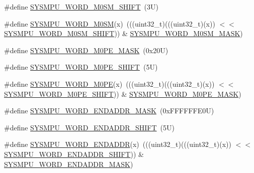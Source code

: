 \begin{DoxyCompactItemize}
\#define \mbox{\hyperlink{group___s_y_s_m_p_u___register___masks_gadaf9df921f73cb74a891b96031c798fb}{S\+Y\+S\+M\+P\+U\+\_\+\+W\+O\+R\+D\+\_\+\+M0\+S\+M\+\_\+\+S\+H\+I\+FT}}~(3\+U)
\item 
\#define \mbox{\hyperlink{group___s_y_s_m_p_u___register___masks_gae2a5cec6f6707a4132761c05f8d69071}{S\+Y\+S\+M\+P\+U\+\_\+\+W\+O\+R\+D\+\_\+\+M0\+SM}}(x)~(((uint32\+\_\+t)(((uint32\+\_\+t)(x)) $<$$<$ \mbox{\hyperlink{group___s_y_s_m_p_u___register___masks_gadaf9df921f73cb74a891b96031c798fb}{S\+Y\+S\+M\+P\+U\+\_\+\+W\+O\+R\+D\+\_\+\+M0\+S\+M\+\_\+\+S\+H\+I\+FT}})) \& \mbox{\hyperlink{group___s_y_s_m_p_u___register___masks_gaa2b6a90954e96cd27843e4977cadecb8}{S\+Y\+S\+M\+P\+U\+\_\+\+W\+O\+R\+D\+\_\+\+M0\+S\+M\+\_\+\+M\+A\+SK}})
\item 
\#define \mbox{\hyperlink{group___s_y_s_m_p_u___register___masks_gaff5e58417e71b136bcef7ac03177ca2e}{S\+Y\+S\+M\+P\+U\+\_\+\+W\+O\+R\+D\+\_\+\+M0\+P\+E\+\_\+\+M\+A\+SK}}~(0x20\+U)
\item 
\#define \mbox{\hyperlink{group___s_y_s_m_p_u___register___masks_gacd7c0ea160bd6c4aef68af6ac0b0d521}{S\+Y\+S\+M\+P\+U\+\_\+\+W\+O\+R\+D\+\_\+\+M0\+P\+E\+\_\+\+S\+H\+I\+FT}}~(5\+U)
\item 
\#define \mbox{\hyperlink{group___s_y_s_m_p_u___register___masks_gabc9d63b645f6a80ceb840c4373d21e9c}{S\+Y\+S\+M\+P\+U\+\_\+\+W\+O\+R\+D\+\_\+\+M0\+PE}}(x)~(((uint32\+\_\+t)(((uint32\+\_\+t)(x)) $<$$<$ \mbox{\hyperlink{group___s_y_s_m_p_u___register___masks_gacd7c0ea160bd6c4aef68af6ac0b0d521}{S\+Y\+S\+M\+P\+U\+\_\+\+W\+O\+R\+D\+\_\+\+M0\+P\+E\+\_\+\+S\+H\+I\+FT}})) \& \mbox{\hyperlink{group___s_y_s_m_p_u___register___masks_gaff5e58417e71b136bcef7ac03177ca2e}{S\+Y\+S\+M\+P\+U\+\_\+\+W\+O\+R\+D\+\_\+\+M0\+P\+E\+\_\+\+M\+A\+SK}})
\item 
\#define \mbox{\hyperlink{group___s_y_s_m_p_u___register___masks_ga3b4055d3f5b44db1c32be889dbfc6d3f}{S\+Y\+S\+M\+P\+U\+\_\+\+W\+O\+R\+D\+\_\+\+E\+N\+D\+A\+D\+D\+R\+\_\+\+M\+A\+SK}}~(0x\+F\+F\+F\+F\+F\+F\+E0\+U)
\item 
\#define \mbox{\hyperlink{group___s_y_s_m_p_u___register___masks_ga774311afd3c172d7d3a12c1c565405b7}{S\+Y\+S\+M\+P\+U\+\_\+\+W\+O\+R\+D\+\_\+\+E\+N\+D\+A\+D\+D\+R\+\_\+\+S\+H\+I\+FT}}~(5\+U)
\item 
\#define \mbox{\hyperlink{group___s_y_s_m_p_u___register___masks_gabe7211d94f810d83d21b2e78c42b42ea}{S\+Y\+S\+M\+P\+U\+\_\+\+W\+O\+R\+D\+\_\+\+E\+N\+D\+A\+D\+DR}}(x)~(((uint32\+\_\+t)(((uint32\+\_\+t)(x)) $<$$<$ \mbox{\hyperlink{group___s_y_s_m_p_u___register___masks_ga774311afd3c172d7d3a12c1c565405b7}{S\+Y\+S\+M\+P\+U\+\_\+\+W\+O\+R\+D\+\_\+\+E\+N\+D\+A\+D\+D\+R\+\_\+\+S\+H\+I\+FT}})) \& \mbox{\hyperlink{group___s_y_s_m_p_u___register___masks_ga3b4055d3f5b44db1c32be889dbfc6d3f}{S\+Y\+S\+M\+P\+U\+\_\+\+W\+O\+R\+D\+\_\+\+E\+N\+D\+A\+D\+D\+R\+\_\+\+M\+A\+SK}})
$$
\end{DoxyCompactItemize}
